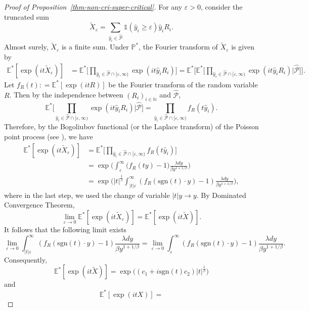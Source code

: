\documentclass[12pt]{amsart}
\theoremstyle{definition}
\theoremstyle{remark}
\newcommand{\N}{\mathbb{N}}
\newcommand{\E}{\mathbb{E}}
\newcommand{\PP}{\mathbb{P}}
\newcommand{\sgn}{\mathrm{sgn}}
\numberwithin{equation}{section}
\begin{document}
\begin{proof}[Proof of Proposition~\ref{thm-non-cri-super-critical}]
For any $\varepsilon>0$, consider the truncated sum
\[
\widetilde{X}_\varepsilon=\sum_{\widehat{y}_i\in \widehat{\mathcal{P}}}\mathds{1}(\widehat{y}_i\ge \varepsilon)\widehat{y}_i R_i.
\]
Almost surely, $\widetilde{X}_\varepsilon$ is a  finite sum. 
 Under $\PP^*$,  the Fourier transform of $\widetilde{X}_\varepsilon$  is given by 
\begin{align*}
\E^*[\exp( it \widetilde{X}_\varepsilon)]&=\E^*\Big[\prod_{\widehat{y}_i \in \widehat{\mathcal{P}} \cap [\varepsilon, \infty)}   \exp (i t  \widehat{y}_i R_i)   \Big] =\E^*\Big [   \E^* \Big[ \prod_{\widehat{y}_i \in \widehat{\mathcal{P}} \cap [\varepsilon, \infty)}   \exp (i t \widehat{y}_i R_i)    \Big| \widehat{\mathcal{P}} \Big] \Big]. 
\end{align*}
Let  $f_R(t): = \E^*[\exp(itR)]$ be the Fourier transform of the random variable $R$. Then by the  independence between  $(R_i)_{i\in\N}$ and $\widehat{\mathcal{P}}$,
\[
 \E^* \Big[ \prod_{\widehat{y}_i \in \widehat{\mathcal{P}} \cap [\varepsilon, \infty)}   \exp (i t \widehat{y}_i R_i)    \Big| \widehat{\mathcal{P}} \Big] =  \prod_{\widehat{y}_i \in \widehat{\mathcal{P}} \cap [\varepsilon, \infty)}      f_R (t\widehat{y}_i). 
\]
Therefore, by the Bogoliubov functional (or the Laplace transform) of the Poisson point process (see \cite[Section 3.2]{Kingman}), we have 
\begin{align*}
\E^*[\exp( it\widetilde{X}_\varepsilon)] & =  \E^*\Big[  \prod_{\widehat{y}_i \in \widehat{\mathcal{P}} \cap [\varepsilon, \infty)}      f_R (t\widehat{y}_i)\Big]
\\
&  =\exp\Big(\int_{\varepsilon}^\infty \big(f_R(ty)-1\big)  \frac{\lambda dy}{ \beta y^{1+1/\beta}}\Big) 
\\
 &  = \exp\Big({|t|^{\frac{1}{\beta}}} \int_{ |t| \varepsilon}^\infty  (f_R( \sgn(t) \cdot y)-1) \frac{\lambda dy}{\beta y^{1+1/\beta}}\Big),
\end{align*}
where in the last step, we used the  change of variable $|t|y \to y$.  
By Dominated Convergence Theorem, 
\[
\lim_{\varepsilon\to 0}  \E^*[\exp( it \widetilde{X}_\varepsilon)] =  \E^*[\exp( it\widetilde{X})]. 
\]
It follows that the following limit exists 
\[
\lim_{\varepsilon\to 0} \int_{ |t| \varepsilon}^\infty  (f_R( \sgn(t)\cdot y)-1) \frac{\lambda dy}{\beta y^{1+1/\beta}} =  \lim_{\varepsilon\to 0} \int_{\varepsilon}^\infty  (f_R( \sgn(t) \cdot y)-1) \frac{\lambda dy}{\beta y^{1+1/\beta}}. 
\]
Consequently, 
\[
\E^*[\exp( it\widetilde{X})] = \exp\big( (c_1  + i \sgn(t) c_2)  |t|^{\frac{1}{\beta}}\big)
\]
and 
\[
 \E^*[\exp( it X)] =
\]
\end{proof}
\end{document}
